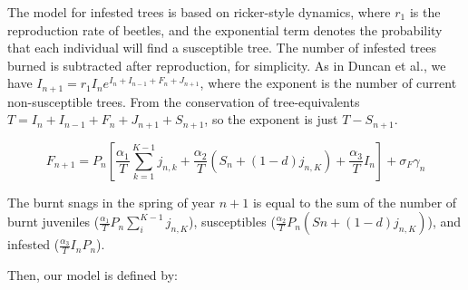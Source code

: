 The model for infested trees is based on ricker-style dynamics, where $r_1$ is the reproduction rate of beetles, and the exponential term denotes the probability that each individual will find a susceptible tree. The number of infested trees burned is subtracted after reproduction, for simplicity. As in Duncan et al., we have $I_{n+1} = r_1 I_n e^{I_n + I_{n-1} + F_n + J_{n+1}}$, where the exponent is the number of current non-susceptible trees. From the conservation of tree-equivalents $T = I_n + I_{n-1} + F_{n} + J_{n+1} + S_{n+1}$, so the exponent is just $T - S_{n+1}$.

\begin{equation}    
  F_{n+1} =  P_n \left[\frac{\alpha_1}{T} \sum_{k = 1}^{K-1} j_{n,k} + \frac{\alpha_2}{T}( S_n + (1 - d)j_{n,K}) + \frac{\alpha_3}{T}I_n\right] + \sigma_F\gamma_n 
\end{equation}

The burnt snags in the spring of year $n+1$ is equal to the sum of the number of burnt juveniles ($\frac{\alpha_1}{T} P_n \sum_i^{K-1} j_{n,K}$), susceptibles ($\frac{\alpha_2}{T}P_n(Sn  + (1-d) j_{n,K}) $), and infested ($ \frac{\alpha_3}{T}I_n P_n$).

Then, our model is defined by:

